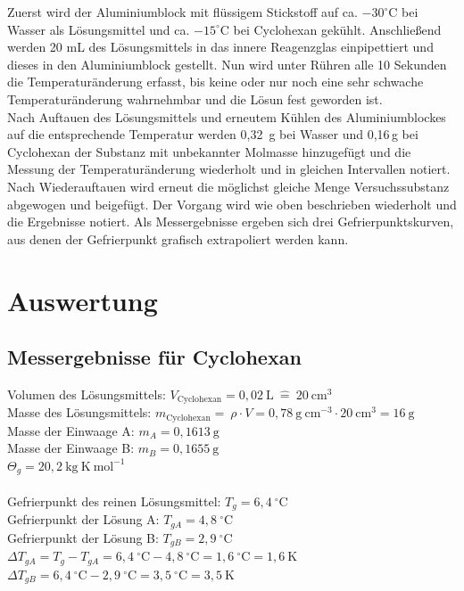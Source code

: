 \documentclass[12pt,a4paper,titlepage,headinclude,bibtotoc]{scrartcl}
\begin{document}
 Zuerst wird der Aluminiumblock mit flüssigem Stickstoff auf ca. $-30 ^\circ\text{C}$ bei Wasser als Lösungsmittel und ca. $-15 ^\circ\text{C}$ bei Cyclohexan gekühlt. Anschließend werden 20 mL des Lösungsmittels in das innere Reagenzglas einpipettiert und dieses in den Aluminiumblock gestellt. Nun wird unter Rühren alle 10 Sekunden die Temperaturänderung erfasst, bis keine oder nur noch eine sehr schwache Temperaturänderung wahrnehmbar und die Lösun fest geworden ist. \\
 Nach Auftauen des Lösungsmittels und erneutem Kühlen des Aluminiumblockes auf die entsprechende Temperatur werden 0,32\, g bei Wasser und 0,16\,g bei Cyclohexan der Substanz mit unbekannter Molmasse hinzugefügt und die Messung der Temperaturänderung wiederholt und in gleichen Intervallen notiert.\\
Nach Wiederauftauen wird erneut die möglichst gleiche Menge Versuchssubstanz abgewogen und beigefügt. Der Vorgang wird wie oben beschrieben wiederholt und die Ergebnisse notiert. Als Messergebnisse ergeben sich drei Gefrierpunktskurven, aus denen der Gefrierpunkt grafisch extrapoliert werden kann.\\
 
 
 







\section{Auswertung}

\subsection{Messergebnisse für Cyclohexan}

Volumen des Lösungsmittels: $V_{\mathrm{Cyclohexan}} = 0,02 {~} \mathrm{L}{~}\widehat{=}{~}20 {~}\mathrm{cm^3}$ \\
Masse des Lösungsmittels:  $m_{\mathrm{Cyclohexan}} = {~} \rho \cdot V = 0,78{~} \mathrm{g {~}cm^{-3}} \cdot 20{~} \mathrm{cm^{3}} = 16{~}\mathrm{g}$\\
Masse der Einwaage A: $m_A = 0,1613{~} \mathrm{g}$\\ 
Masse der Einwaage B: $m_B = 0,1655{~} \mathrm{g}$\\
$\Theta _g = 20,2 {~} \mathrm{kg{~}K {~} mol^{-1}}$\\\\
Gefrierpunkt des reinen Lösungsmittel: $ T_g = 6,4 {~}^{\circ}\text{C}$\\
Gefrierpunkt der Lösung A: $ T_{gA} = 4,8 {~}^{\circ}\text{C}$\\
Gefrierpunkt der Lösung B: $ T_{gB} = 2,9 {~}^{\circ}\text{C}$\\
$ \Delta T _{gA} = T_g - T _{gA} = 6,4 {~}^{\circ}\text{C} - 4,8 {~}^{\circ}\text{C} = 1,6 {~}^{\circ}\text{C} = 1,6{~}\mathrm{K} $\\
$ \Delta T _{gB} = 6,4 {~}^{\circ}\text{C} - 2,9 {~}^{\circ}\text{C} = 3,5 {~}^{\circ}\text{C} = 3,5 {~} \mathrm{K} $
\end{document}
